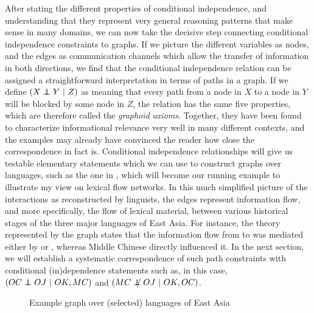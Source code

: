 After stating the different properties of conditional independence, and understanding that they represent very general reasoning patterns that make sense in many domains, we can now take the decisive step connecting conditional independence constraints to graphs. If we picture the different variables as nodes, and the edges as communication channels which allow the transfer of information in both directions, we find that the conditional independence relation can be assigned a straightforward interpretation in terms of paths in a graph. If we define $(X \independent Y\ |\ Z)$ as meaning that every path from a node in $X$ to a node in $Y$ will be blocked by some node in $Z$, the relation has the same five properties, which are therefore called the \textit{graphoid axioms}. Together, they have been found to characterize informational relevance very well in many different contexts, and the examples may already have convinced the reader how close the correspondence in fact is. Conditional 
independence relationships will give us testable elementary statements which we can use to construct graphs over languages, such as the one in , which will become our running example to illustrate my view on lexical flow networks. In this much simplified picture of the interactions as reconstructed by linguists, the edges represent information flow, and more specifically, the flow of lexical material, between various historical stages of the three major languages of East Asia. For instance, the theory represented by the graph states that the information flow from  to  was mediated either by  or , whereas Middle Chinese directly influenced it. In the next section, we will establish a systematic correspondence of such path constraints with conditional (in)dependence statements such as, in this case, $(OC \independent OJ\ |\ OK, MC)$ and $(MC \notindep OJ\ |\ OK, OC)$.

\begin{figure}
 \caption{Example graph over (selected) languages of East Asia}
\label{fig:langGraph}
\end{figure}


